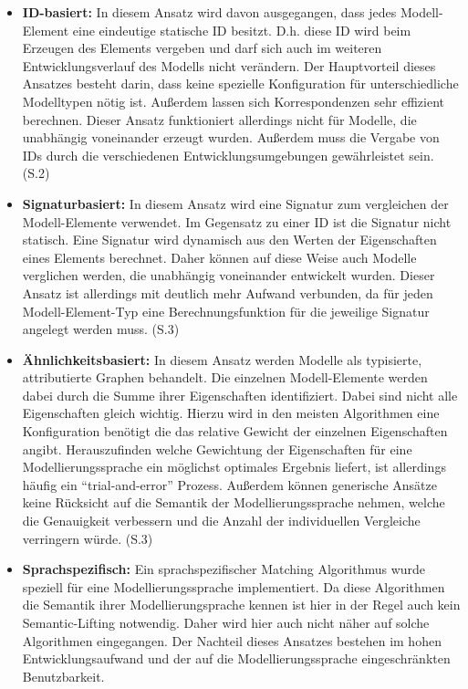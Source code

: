 \begin{itemize}
  \item \textbf{ID-basiert:} In diesem Ansatz wird davon ausgegangen, dass jedes Modell-Element eine
  eindeutige statische ID besitzt. D.h. diese ID wird beim Erzeugen des Elements vergeben und darf
  sich auch im weiteren Entwicklungsverlauf des Modells nicht verändern. Der Hauptvorteil dieses
  Ansatzes besteht darin, dass keine spezielle Konfiguration für unterschiedliche Modelltypen nötig
  ist. Außerdem lassen sich Korrespondenzen sehr effizient berechnen. Dieser Ansatz funktioniert
  allerdings nicht für Modelle, die unabhängig voneinander erzeugt wurden. Außerdem muss die Vergabe
  von IDs durch die verschiedenen Entwicklungsumgebungen gewährleistet sein. \cite{KPRP2009} (S.2)
  
  \item \textbf{Signaturbasiert:} In diesem Ansatz wird eine Signatur zum vergleichen der
  Modell-Elemente verwendet. Im Gegensatz zu einer ID ist die Signatur nicht statisch. Eine Signatur
  wird dynamisch aus den Werten der Eigenschaften eines Elements berechnet. Daher können auf diese
  Weise auch Modelle verglichen werden, die unabhängig voneinander entwickelt wurden. Dieser
  Ansatz ist allerdings mit deutlich mehr Aufwand verbunden, da für jeden Modell-Element-Typ eine
  Berechnungsfunktion für die jeweilige Signatur angelegt werden muss. \cite{KPRP2009} (S.3)
  
  \item \textbf{Ähnlichkeitsbasiert:} In diesem Ansatz werden Modelle als typisierte, attributierte
  Graphen behandelt. Die einzelnen Modell-Elemente werden dabei durch die Summe ihrer Eigenschaften
  identifiziert. Dabei sind nicht alle Eigenschaften gleich wichtig. Hierzu wird in den meisten
  Algorithmen eine Konfiguration benötigt die das relative Gewicht der einzelnen Eigenschaften
  angibt. Herauszufinden welche Gewichtung der Eigenschaften für eine Modellierungssprache ein
  möglichst optimales Ergebnis liefert, ist allerdings häufig ein "`trial-and-error"' Prozess.
  Außerdem können generische Ansätze keine Rücksicht auf die Semantik der Modellierungssprache
  nehmen, welche die Genauigkeit verbessern und die Anzahl der individuellen Vergleiche verringern
  würde. \cite{KPRP2009} (S.3)
  
  \item \textbf{Sprachspezifisch:} Ein sprachspezifischer Matching Algorithmus wurde speziell für
  eine Modellierungssprache implementiert. Da diese Algorithmen die Semantik ihrer
  Modellierungsprache kennen ist hier in der Regel auch kein Semantic-Lifting notwendig. Daher wird
  hier auch nicht näher auf solche Algorithmen eingegangen. Der Nachteil dieses Ansatzes bestehen
  im hohen Entwicklungsaufwand und der auf die Modellierungssprache eingeschränkten Benutzbarkeit.
\end{itemize}
